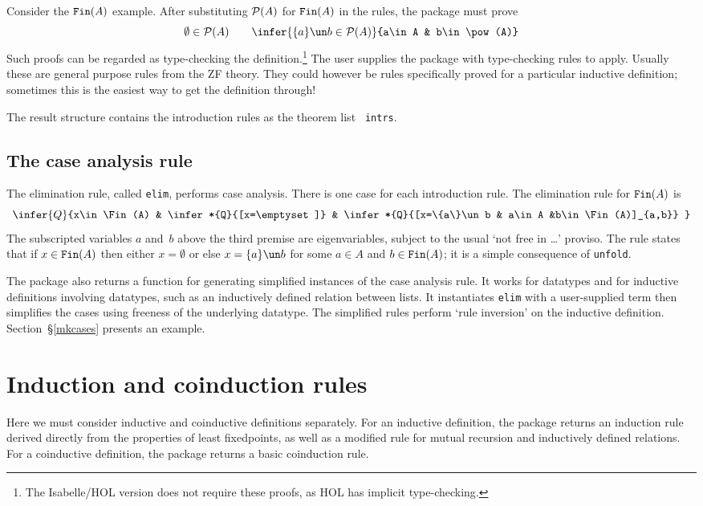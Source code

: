 Consider the $\hbox{\tt Fin}(A)$ example.  After substituting ${\cal P}(A)$ for $\hbox{\tt Fin}(A)$
in the rules, the package must prove
\[  \emptyset\in\pow(A)  \qquad 
    \infer{\{a\}\un b\in\pow(A)}{a\in A & b\in\pow(A)} 
\]
Such proofs can be regarded as type-checking the definition.\footnote{The
  Isabelle/HOL version does not require these proofs, as HOL has implicit
  type-checking.}  The user supplies the package with type-checking rules to
apply.  Usually these are general purpose rules from the ZF theory.  They
could however be rules specifically proved for a particular inductive
definition; sometimes this is the easiest way to get the definition
through!

The result structure contains the introduction rules as the theorem list {\tt
intrs}.

\subsection{The case analysis rule}
The elimination rule, called {\tt elim}, performs case analysis.  There is one
case for each introduction rule.  The elimination rule
for $\hbox{\tt Fin}(A)$ is
\[ \infer{Q}{x\in\Fin(A) & \infer*{Q}{[x=\emptyset]}
                 & \infer*{Q}{[x=\{a\}\un b & a\in A &b\in\Fin(A)]_{a,b}} }
\]
The subscripted variables $a$ and~$b$ above the third premise are
eigenvariables, subject to the usual `not free in \ldots' proviso.
The rule states that if $x\in\hbox{\tt Fin}(A)$ then either $x=\emptyset$ or else
$x=\{a\}\un b$ for some $a\in A$ and $b\in\hbox{\tt Fin}(A)$; it is a simple consequence
of {\tt unfold}.

The package also returns a function for generating simplified instances of
the case analysis rule.  It works for datatypes and for inductive
definitions involving datatypes, such as an inductively defined relation
between lists.  It instantiates {\tt elim} with a user-supplied term then
simplifies the cases using freeness of the underlying datatype.  The
simplified rules perform `rule inversion' on the inductive definition.
Section~\S\ref{mkcases} presents an example.


\section{Induction and coinduction rules}
Here we must consider inductive and coinductive definitions separately.
For an inductive definition, the package returns an induction rule derived
directly from the properties of least fixedpoints, as well as a modified
rule for mutual recursion and inductively defined relations.  For a
coinductive definition, the package returns a basic coinduction rule.

